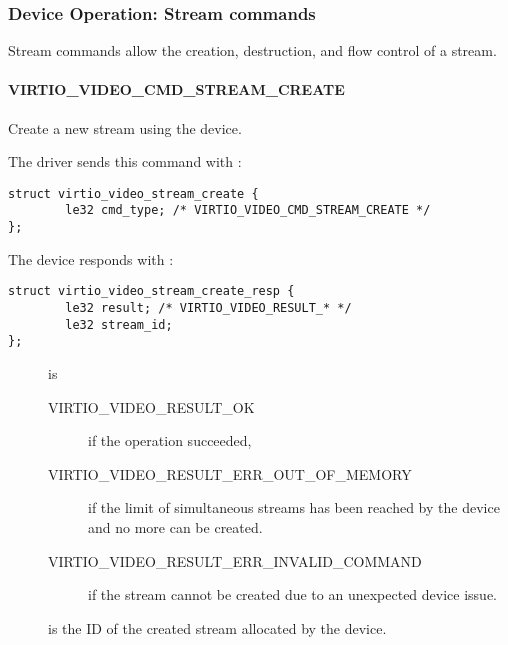 \subsubsection{Device Operation: Stream commands}\label{sec:Device Types / Video Device / Device Operation / Device Operation: Stream commands}

Stream commands allow the creation, destruction, and flow control of a
stream.

\paragraph{VIRTIO_VIDEO_CMD_STREAM_CREATE}\label{sec:Device Types / Video Device / Device Operation / Device Operation: Stream commands / VIRTIO_VIDEO_CMD_STREAM_CREATE}

Create a new stream using the device.

The driver sends this command with
:

\begin{lstlisting}
struct virtio_video_stream_create {
        le32 cmd_type; /* VIRTIO_VIDEO_CMD_STREAM_CREATE */
};
\end{lstlisting}

The device responds with :

\begin{lstlisting}
struct virtio_video_stream_create_resp {
        le32 result; /* VIRTIO_VIDEO_RESULT_* */
        le32 stream_id;
};
\end{lstlisting}

\begin{description}
\item[]
is

\begin{description}
\item[VIRTIO\_VIDEO\_RESULT\_OK]
if the operation succeeded,
\item[VIRTIO\_VIDEO\_RESULT\_ERR\_OUT\_OF\_MEMORY]
if the limit of simultaneous streams has been reached by the device and
no more can be created.
\item[VIRTIO\_VIDEO\_RESULT\_ERR\_INVALID\_COMMAND]
if the stream cannot be created due to an unexpected device issue.
\end{description}
\item[]
is the ID of the created stream allocated by the device.
\end{description}

